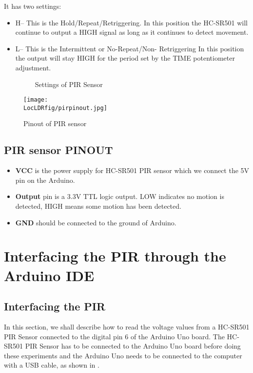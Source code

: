 It has two settings:
\begin{itemize}
  \item 	H– This is the Hold/Repeat/Retriggering. In this position the HC-SR501 will continue to output a HIGH signal as long as it continues to detect   movement.
  \item  L– This is the Intermittent or No-Repeat/Non- Retriggering In this position the output will stay HIGH for the period set by the TIME potentiometer adjustment.
\begin{figure}[hpt]
  \centering
   \hfill
  \caption{Settings of PIR Sensor}
\end{figure}
\end{itemize}
\begin{figure}[hpt]
  \centering
    \texttt{[image: \\LocLDRfig/pirpinout.jpg]}
    \label{fig:pinp} \hfill
  \caption{Pinout of PIR sensor}
\end{figure} 
\subsection{PIR sensor PINOUT}


\begin{itemize}
  \item \textbf{VCC} is the power supply for HC-SR501 PIR sensor which we connect the 5V pin on the Arduino.
  \item \textbf{Output} pin is a 3.3V TTL logic output. LOW indicates no motion is detected, HIGH means some motion has been detected.
  \item \textbf{GND} should be connected to the ground of Arduino.
\end{itemize}

\section{Interfacing the PIR through the Arduino IDE}
\label{sec:pir-arduino-code}
\subsection{Interfacing the PIR}
In this section, we shall describe how to read the voltage values from a HC-SR501 PIR Sensor connected to the digital pin 6 of the Arduino Uno board. The HC-SR501 PIR Sensor has to be connected to the Arduino Uno board before doing these experiments and the Arduino Uno needs to be connected to the computer with a USB cable, as shown in .

